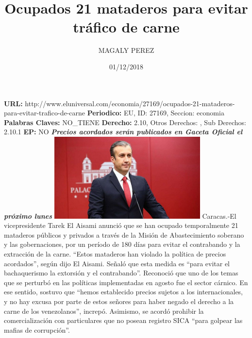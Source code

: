 \documentclass{article}%
\title{\textbf{Ocupados 21 mataderos para evitar tráfico de carne}}%
\author{MAGALY PEREZ}%
\date{01/12/2018}%
\begin{document}
%
\normalsize%
\maketitle%
\textbf{URL: }%
http://www.eluniversal.com/economia/27169/ocupados{-}21{-}mataderos{-}para{-}evitar{-}trafico{-}de{-}carne\newline%
%
\textbf{Periodico: }%
EU, %
ID: %
27169, %
Seccion: %
economia\newline%
%
\textbf{Palabras Claves: }%
NO\_TIENE\newline%
%
\textbf{Derecho: }%
2.10, %
Otros Derechos: %
, %
Sub Derechos: %
2.10.1\newline%
%
\textbf{EP: }%
NO\newline%
\newline%
%
\textbf{\textit{Precios acordados serán publicados en Gaceta Oficial el próximo lunes}}%
\newline%
\newline%
%
\includegraphics[width=300px]{42.jpg}%
\newline%
%
Caracas.{-}El vicepresidente Tarek El Aisami anunció que se han ocupado temporalmente 21 mataderos públicos y privados a través de la Misión de Abastecimiento soberano y las gobernaciones, por un período de 180 días  para evitar el contrabando y la extracción de la carne.%
\newline%
%
“Estos mataderos han violado la política de precios acordados”, según dijo El Aisami.%
\newline%
%
Señaló que esta medida es “para evitar el bachaquerismo la extorsión y el contrabando”.%
\newline%
%
Reconoció que uno de los temas que se perturbó en las políticas implementadas en agosto fue el sector cárnico.%
\newline%
%
En ese sentido, sostuvo que “hemos establecido precios sujetos a los internacionales, y no hay excusa por parte de estos señores para haber negado el derecho a la carne de los venezolanos”, increpó.%
\newline%
%
Asimismo, se acordó prohibir la comercialización con particulares que no posean registro SICA “para golpear las mafias de corrupción”.%
\end{document}
